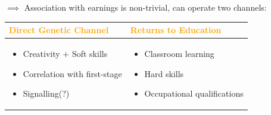 \documentclass[dvipsnames,handout]{beamer} %
\begin{document}
\begin{frame}
    $\implies$ Association with earnings is non-trivial, can operate two channels:
    \begin{table}
        \centering
        \begin{tabular}{p{} | p{}}
            \textcolor{orange}{Direct Genetic Channel} &
                \textcolor{orange}{Returns to Education} \\ \hline
            \begin{itemize}
                \item Creativity $+$ Soft skills
                \item Correlation with first-stage
                \item Signalling(?)
            \end{itemize} &
            \begin{itemize}
                \item Classroom learning
                \item Hard skills
                \item Occupational qualifications
            \end{itemize}
        \end{tabular}
    \end{table}
\end{frame}
\end{document}
